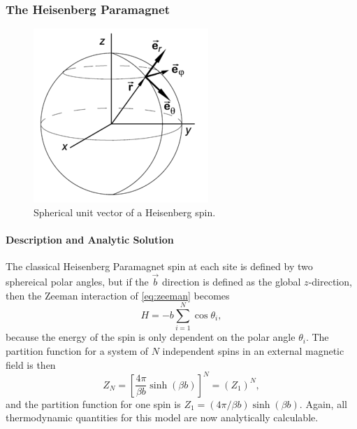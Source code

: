 \documentclass[a4paper,12pt]{article}
\begin{document}
	\subsubsection{The Heisenberg Paramagnet}
	\begin{figure}[H]
			\centering
			\includegraphics[scale=5.0]{spherical_unit_vector}
			\caption{Spherical unit vector of a Heisenberg spin.}
			\label{fig:spherical_unit_vector}
		\end{figure}
		\paragraph{Description and Analytic Solution}
		The classical Heisenberg Paramagnet spin at each site is defined by two sphereical polar angles, but if the $\vec{b}$ direction is defined as the global $z$-direction, then the Zeeman interaction of \eqref{eq:zeeman} becomes
		\begin{equation}\label{eq:heisenberg_PM_hamiltonian}
			H = -b\sum_{i=1}^N{\cos \theta_i},
		\end{equation}
		because the energy of the spin is only dependent on the polar angle $\theta_i$. The partition function for a system of $N$ independent spins in an external magnetic field is then
		\begin{equation}\label{eq:heisenberg_para_partition_fxn}
			Z_N = \left[\frac{4\pi}{\beta b}\sinh(\beta b)\right]^N = (Z_1)^N,
		\end{equation}
		and the partition function for one spin is $Z_1 = (4\pi/\beta b)\sinh(\beta b)$. Again, all thermodynamic quantities for this model are now analytically calculable.
\end{document}
